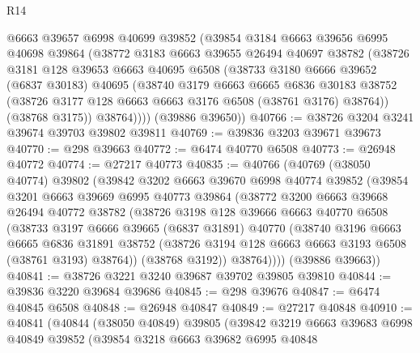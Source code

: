 \begin{lexlean}{R14}
\begin{coremodule}
        @6663
        @39657
        @6998
        @40699
        @39852
        (@39854
          @3184
          @6663
          @39656
          @6995
          @40698
          @39864
          (@38772
            @3183
            @6663
            @39655
            @26494
            @40697
            @38782
            (@38726
              @3181
              @128
              @39653
              @6663
              @40695
              @6508
              (@38733
                @3180
                @6666
                @39652
                (@6837 @30183)
                @40695
                (@38740
                  @3179
                  @6663
                  @6665
                  @6836
                  @30183
                  @38752
                  (@38726 @3177 @128 @6663 @6663 @3176 @6508 (@38761 @3176) @38764))
                (@38768 @3175))
              @38764))))
      (@39886 @39650))
@40766 := @38726 @3204 @3241 @39674 @39703 @39802 @39811
@40769 := @39836 @3203 @39671 @39673
@40770 := @298 @39663
@40772 := @6474 @40770 @6508
@40773 := @26948 @40772
@40774 := @27217 @40773
@40835 := @40766
    (@40769
      (@38050 @40774)
      @39802
      (@39842
        @3202
        @6663
        @39670
        @6998
        @40774
        @39852
        (@39854
          @3201
          @6663
          @39669
          @6995
          @40773
          @39864
          (@38772
            @3200
            @6663
            @39668
            @26494
            @40772
            @38782
            (@38726
              @3198
              @128
              @39666
              @6663
              @40770
              @6508
              (@38733
                @3197
                @6666
                @39665
                (@6837 @31891)
                @40770
                (@38740
                  @3196
                  @6663
                  @6665
                  @6836
                  @31891
                  @38752
                  (@38726 @3194 @128 @6663 @6663 @3193 @6508 (@38761 @3193) @38764))
                (@38768 @3192))
              @38764))))
      (@39886 @39663))
@40841 := @38726 @3221 @3240 @39687 @39702 @39805 @39810
@40844 := @39836 @3220 @39684 @39686
@40845 := @298 @39676
@40847 := @6474 @40845 @6508
@40848 := @26948 @40847
@40849 := @27217 @40848
@40910 := @40841
    (@40844
      (@38050 @40849)
      @39805
      (@39842
        @3219
        @6663
        @39683
        @6998
        @40849
        @39852
        (@39854
          @3218
          @6663
          @39682
          @6995
          @40848

\end{coremodule}
\end{lexlean}
